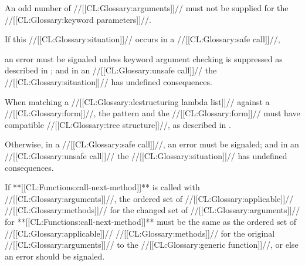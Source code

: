 \endsubsubsection%



An odd number of //[[CL:Glossary:arguments]]// must not be supplied for the //[[CL:Glossary:keyword parameters]]//.



If this //[[CL:Glossary:situation]]// occurs in a //[[CL:Glossary:safe call]]//,

an error  must be signaled
unless keyword argument checking is suppressed as described
in \secref\SuppressingKeyArgChecks;
and in an //[[CL:Glossary:unsafe call]]// the //[[CL:Glossary:situation]]// has undefined consequences.










\endsubsubsection%



When matching a //[[CL:Glossary:destructuring lambda list]]// against a //[[CL:Glossary:form]]//,
the pattern and the //[[CL:Glossary:form]]// must have compatible //[[CL:Glossary:tree structure]]//,
as described in \secref\ExtraDestructureInfo.

Otherwise, in a //[[CL:Glossary:safe call]]//,
an error  must be signaled;
and in an //[[CL:Glossary:unsafe call]]// the //[[CL:Glossary:situation]]// has undefined consequences.










\endsubsubsection%


If **[[CL:Functions:call-next-method]]** is called with //[[CL:Glossary:arguments]]//, the ordered
set of //[[CL:Glossary:applicable]]// //[[CL:Glossary:methods]]// for the changed set of //[[CL:Glossary:arguments]]//
for **[[CL:Functions:call-next-method]]** must be the same as the ordered set of 
//[[CL:Glossary:applicable]]// //[[CL:Glossary:methods]]// for the original //[[CL:Glossary:arguments]]// to the
//[[CL:Glossary:generic function]]//, or else an error should be signaled.

